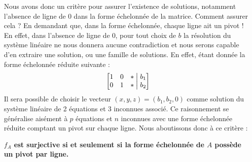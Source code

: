 \documentclass{article}
\begin{document}
\noindent Nous avons donc un critère pour assurer l'existence de solutions, notamment l'absence de ligne de $0$ dans la forme échelonnée de la matrice. Comment assurer cela ? En demandant que, dans la forme échelonnée, chaque ligne ait un pivot ! En effet, dans l'absence de ligne de $0$, pour tout choix de $b$ la résolution du système linéaire ne nous donnera aucune contradiction et nous serons capable d'en extraire une solution, ou une famille de solutions. En effet, étant donnée la forme échelonnée réduite suivante :
$$\begin{bmatrix}
1 & 0 & * \bigm| b_1 \\
0 & 1 & * \bigm| b_2
\end{bmatrix}
$$ 
Il sera possible de choisir le vecteur $(x,y,z) = (b_1, b_2, 0)$ comme solution du système linéaire de 2 équations et 3 inconnues associé. Ce raisonnement se généralise aisément à $p$ équations et $n$ inconnues avec une forme échelonnée réduite comptant un pivot sur chaque ligne. Nous aboutissons donc à ce critère : \\
\begin{center}
    \textbf{$f_A$ est surjective si et seulement si la forme échelonnée de $A$ possède un pivot par ligne.}
\end{center}
\end{document}
